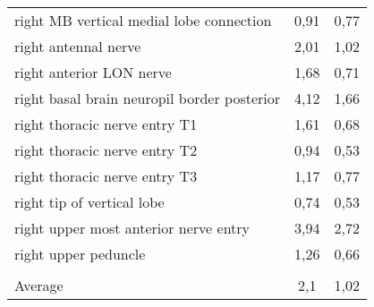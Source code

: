 \begin{tabular}{lcc}
 right MB vertical medial lobe connection    & 0,91          & 0,77             \\
 right antennal nerve                        & 2,01          & 1,02             \\
 right anterior LON nerve                    & 1,68          & 0,71             \\
 right basal brain neuropil border posterior & 4,12          & 1,66             \\
 right thoracic nerve entry T1               & 1,61          & 0,68             \\
 right thoracic nerve entry T2               & 0,94          & 0,53             \\
 right thoracic nerve entry T3               & 1,17          & 0,77             \\
 right tip of vertical lobe                  & 0,74          & 0,53             \\
 right upper most anterior nerve entry       & 3,94          & 2,72             \\
 right upper peduncle                        & 1,26          & 0,66             \\
                                             &               &                  \\ \hline \hline
 Average                                     & 2,1           & 1,02             \\
\hline
\end{tabular}